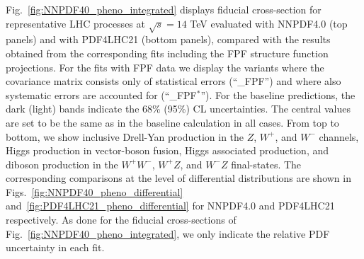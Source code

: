 Fig.~\ref{fig:NNPDF40_pheno_integrated} displays
fiducial cross-section for representative LHC processes at $\sqrt{s}=14$ TeV
evaluated with NNPDF4.0 (top panels)
and with PDF4LHC21 (bottom panels),
compared with the results obtained from
the corresponding fits including the FPF structure function projections.
%
For the fits with FPF data we display the variants where the covariance matrix
consists only of statistical errors (``\_FPF'') and where also
systematic errors are accounted for (``\_FPF$^*$'').
%
For the baseline
predictions, the dark (light) bands indicate the 68\% (95\%) CL uncertainties.
%
The central values are set to be the same as in the baseline calculation in all cases.
%
From top to bottom, we show inclusive Drell-Yan production in the $Z$, $W^+$, and $W^-$
channels, Higgs production
in vector-boson fusion, Higgs associated
production, and diboson production in the $W^+W^-$, $W^+Z$, and $W^-Z$ final-states.
%
The corresponding comparisons at the level of differential distributions
are shown in Figs.~\ref{fig:NNPDF40_pheno_differential} and~\ref{fig:PDF4LHC21_pheno_differential}
for NNPDF4.0 and PDF4LHC21 respectively.
%
As done for the fiducial cross-sections of Fig.~\ref{fig:NNPDF40_pheno_integrated},
we only indicate the relative PDF uncertainty in each fit.

